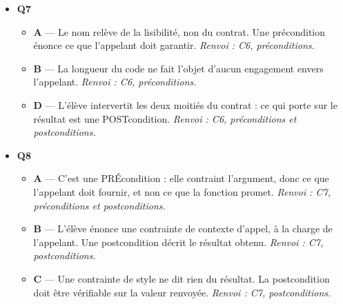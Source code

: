 \begin{itemize}
\begin{itemize}
  \end{itemize}
  \item \textbf{Q7}
  \begin{itemize}
    \item \textbf{A} — Le nom relève de la lisibilité, non du contrat. Une précondition énonce ce que l'appelant doit garantir. \emph{Renvoi : C6, préconditions.}
    \item \textbf{B} — La longueur du code ne fait l'objet d'aucun engagement envers l'appelant. \emph{Renvoi : C6, préconditions.}
    \item \textbf{D} — L'élève intervertit les deux moitiés du contrat : ce qui porte sur le résultat est une POSTcondition. \emph{Renvoi : C6, préconditions et postconditions.}
  \end{itemize}
  \item \textbf{Q8}
  \begin{itemize}
    \item \textbf{A} — C'est une PRÉcondition : elle contraint l'argument, donc ce que l'appelant doit fournir, et non ce que la fonction promet. \emph{Renvoi : C7, préconditions et postconditions.}
    \item \textbf{B} — L'élève énonce une contrainte de contexte d'appel, à la charge de l'appelant. Une postcondition décrit le résultat obtenu. \emph{Renvoi : C7, postconditions.}
    \item \textbf{C} — Une contrainte de style ne dit rien du résultat. La postcondition doit être vérifiable sur la valeur renvoyée. \emph{Renvoi : C7, postconditions.}
  \end{itemize}
\end{itemize}
\fi
